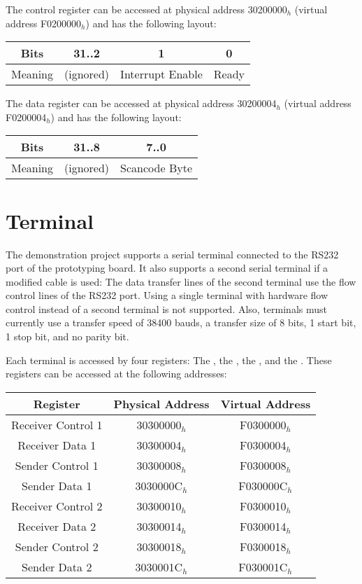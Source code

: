 The control register can be accessed at physical address 30200000$_h$ (virtual address F0200000$_h$) and has the following layout:

\begin{tabular}{|c|c|c|c|}
\hline
Bits & 31..2 & 1 & 0\\
\hline
Meaning & (ignored) & Interrupt Enable & Ready\\
\hline
\end{tabular}

The data register can be accessed at physical address 30200004$_h$ (virtual address F0200004$_h$) and has the following layout:

\begin{tabular}{|c|c|c|}
\hline
Bits & 31..8 & 7..0\\
\hline
Meaning & (ignored) & Scancode Byte\\
\hline
\end{tabular}

\section{Terminal}

The demonstration project supports a serial terminal connected to the RS232 port of the prototyping board. It also supports a second serial terminal if a modified cable is used: The data transfer lines of the second terminal use the flow control lines of the RS232 port. Using a single terminal with hardware flow control instead of a second terminal is not supported. Also, terminals must currently use a transfer speed of 38400 bauds, a transfer size of 8 bits, 1 start bit, 1 stop bit, and no parity bit.

Each terminal is accessed by four registers: The , the , the , and the . These registers can be accessed at the following addresses: 

\begin{tabular}{|c|c|c|}
\hline
Register & Physical Address & Virtual Address\\
\hline
Receiver Control 1 & 30300000$_h$ & F0300000$_h$\\
\hline
Receiver Data 1 & 30300004$_h$ & F0300004$_h$\\
\hline
Sender Control 1 & 30300008$_h$ & F0300008$_h$\\
\hline
Sender Data 1 & 3030000C$_h$ & F030000C$_h$\\
\hline
Receiver Control 2 & 30300010$_h$ & F0300010$_h$\\
\hline
Receiver Data 2 & 30300014$_h$ & F0300014$_h$\\
\hline
Sender Control 2 & 30300018$_h$ & F0300018$_h$\\
\hline
Sender Data 2 & 3030001C$_h$ & F030001C$_h$\\
\hline
\end{tabular}

